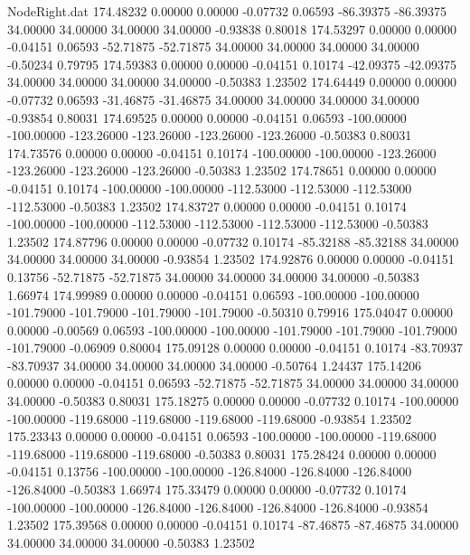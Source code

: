 \begin{filecontents}{NodeRight.dat}
 174.48232    0.00000    0.00000    -0.07732    0.06593  -86.39375  -86.39375   34.00000   34.00000   34.00000   34.00000   -0.93838    0.80018
 174.53297    0.00000    0.00000    -0.04151    0.06593  -52.71875  -52.71875   34.00000   34.00000   34.00000   34.00000   -0.50234    0.79795
 174.59383    0.00000    0.00000    -0.04151    0.10174  -42.09375  -42.09375   34.00000   34.00000   34.00000   34.00000   -0.50383    1.23502
 174.64449    0.00000    0.00000    -0.07732    0.06593  -31.46875  -31.46875   34.00000   34.00000   34.00000   34.00000   -0.93854    0.80031
 174.69525    0.00000    0.00000    -0.04151    0.06593 -100.00000 -100.00000 -123.26000 -123.26000 -123.26000 -123.26000   -0.50383    0.80031
 174.73576    0.00000    0.00000    -0.04151    0.10174 -100.00000 -100.00000 -123.26000 -123.26000 -123.26000 -123.26000   -0.50383    1.23502
 174.78651    0.00000    0.00000    -0.04151    0.10174 -100.00000 -100.00000 -112.53000 -112.53000 -112.53000 -112.53000   -0.50383    1.23502
 174.83727    0.00000    0.00000    -0.04151    0.10174 -100.00000 -100.00000 -112.53000 -112.53000 -112.53000 -112.53000   -0.50383    1.23502
 174.87796    0.00000    0.00000    -0.07732    0.10174  -85.32188  -85.32188   34.00000   34.00000   34.00000   34.00000   -0.93854    1.23502
 174.92876    0.00000    0.00000    -0.04151    0.13756  -52.71875  -52.71875   34.00000   34.00000   34.00000   34.00000   -0.50383    1.66974
 174.99989    0.00000    0.00000    -0.04151    0.06593 -100.00000 -100.00000 -101.79000 -101.79000 -101.79000 -101.79000   -0.50310    0.79916
 175.04047    0.00000    0.00000    -0.00569    0.06593 -100.00000 -100.00000 -101.79000 -101.79000 -101.79000 -101.79000   -0.06909    0.80004
 175.09128    0.00000    0.00000    -0.04151    0.10174  -83.70937  -83.70937   34.00000   34.00000   34.00000   34.00000   -0.50764    1.24437
 175.14206    0.00000    0.00000    -0.04151    0.06593  -52.71875  -52.71875   34.00000   34.00000   34.00000   34.00000   -0.50383    0.80031
 175.18275    0.00000    0.00000    -0.07732    0.10174 -100.00000 -100.00000 -119.68000 -119.68000 -119.68000 -119.68000   -0.93854    1.23502
 175.23343    0.00000    0.00000    -0.04151    0.06593 -100.00000 -100.00000 -119.68000 -119.68000 -119.68000 -119.68000   -0.50383    0.80031
 175.28424    0.00000    0.00000    -0.04151    0.13756 -100.00000 -100.00000 -126.84000 -126.84000 -126.84000 -126.84000   -0.50383    1.66974
 175.33479    0.00000    0.00000    -0.07732    0.10174 -100.00000 -100.00000 -126.84000 -126.84000 -126.84000 -126.84000   -0.93854    1.23502
 175.39568    0.00000    0.00000    -0.04151    0.10174  -87.46875  -87.46875   34.00000   34.00000   34.00000   34.00000   -0.50383    1.23502

\end{filecontents}
